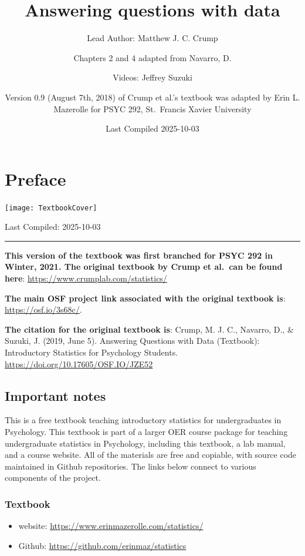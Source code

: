 \documentclass[
]{book}
\title{Answering questions with data}
\author{Lead Author: Matthew J. C. Crump \and Chapters 2 and 4 adapted from Navarro, D. \and Videos: Jeffrey Suzuki \and Version 0.9 (August 7th, 2018) of Crump et al.'s textbook was adapted by Erin L. Mazerolle for PSYC 292, St.~Francis Xavier University}
\date{Last Compiled 2025-10-03}
\providecommand{\tightlist}{%
  \setlength{\itemsep}{0pt}\setlength{\parskip}{0pt}}
\begin{document}
\maketitle

{
\setcounter{tocdepth}{1}
\tableofcontents
}
\chapter*{Preface}\label{preface}

\begin{center}\texttt{[image: TextbookCover]} \end{center}

Last Compiled: 2025-10-03

\begin{center}\rule{0.5\linewidth}{0.5pt}\end{center}

\textbf{This version of the textbook was first branched for PSYC 292 in Winter, 2021. The original textbook by Crump et al.~can be found here}: \url{https://www.crumplab.com/statistics/}

\textbf{The main OSF project link associated with the original textbook is}: \url{https://osf.io/3s68c/}.

\textbf{The citation for the original textbook is}: Crump, M. J. C., Navarro, D., \& Suzuki, J. (2019, June 5). Answering Questions with Data (Textbook): Introductory Statistics for Psychology Students. \url{https://doi.org/10.17605/OSF.IO/JZE52}

\section{Important notes}\label{important-notes}

This is a free textbook teaching introductory statistics for undergraduates in Psychology. This textbook is part of a larger OER course package for teaching undergraduate statistics in Psychology, including this textbook, a lab manual, and a course website. All of the materials are free and copiable, with source code maintained in Github repositories. The links below connect to various components of the project.

\subsection{Textbook}\label{textbook}

\begin{itemize}
\tightlist
\item
  website: \href{https://crumplab.github.io/statistics/}{https://www.erinmazerolle.com/statistics/}
\item
  Github: \url{https://github.com/erinmaz/statistics}
\end{itemize}
\end{document}
